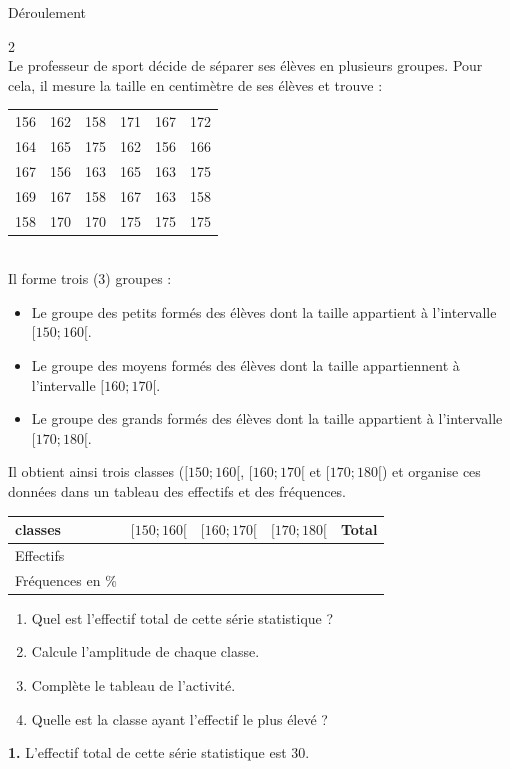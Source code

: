  \newpage
 \begin{center}
 	Déroulement
 \end{center}
 \begin{multicols*}{2}
 	\\
 	\setcounter{q}{0}
 	Le professeur de sport décide de séparer ses élèves en plusieurs groupes. Pour cela, il mesure la taille en centimètre de ses élèves et trouve :
 	
 	\begin{tabular}{cccccc}
 		\hline
 		156 & 162 & 158 & 171 & 167 & 172 \\
 		164 & 165 & 175 & 162 & 156 & 166 \\
 		167 & 156 & 163 & 165 & 163 & 175 \\
 		169 & 167 & 158 & 167 & 163 & 158 \\
 		158 & 170 & 170 & 175 & 175 & 175 \\
 		\hline
 	\end{tabular} \\
 	Il forme trois (3) groupes :
 	
 	\begin{itemize}
 		\item Le groupe des petits formés des élèves dont la taille appartient à l'intervalle $[150; 160[$.
 		\item Le groupe des moyens formés des élèves dont la taille appartiennent à l'intervalle $[160; 170[$.
 		\item Le groupe des grands formés des élèves dont la taille appartient à l'intervalle $[170; 180[$.
 	\end{itemize}Il obtient ainsi trois classes ($[150; 160[$, $[160; 170[$ et $[170; 180[$) et organise ces données dans un tableau des effectifs et des fréquences.\\
 	\renewcommand{\arraystretch}{1.5}
 	
 	\hspace*{-1cm}\begin{tabular}{|p{1.7cm}|c|c|c|c|}
 		\hline
 		classes & $[150; 160[$ & $[160;170[$ & $[170; 180[$ & Total \\ \hline
 		Effectifs & & & & \\ \hline
 		Fréquences en \% & & & & \\ 
 		\hline
 	\end{tabular}
 	
 	\begin{enumerate}
 		\item Quel est l'effectif total de cette série statistique ? 
 		\item Calcule l'amplitude de chaque classe.
 		\item Complète le tableau de l'activité.
 		\item Quelle est la classe ayant l'effectif le plus élevé ?
 	\end{enumerate}
 	\dure 
 	\resul
 	\textbf{1.} L'effectif total de cette série statistique est 30.
 	

\end{multicols*}
